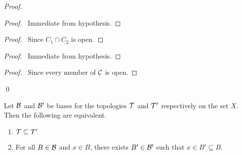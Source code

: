 \begin{proof}
    \pf
    \begin{proof}
        \pf\ Immediate from hypothesis.
    \end{proof}
    \begin{proof}
        \pf\ Since $C_1 \cap C_2$ is open.
    \end{proof}
    \begin{proof}
        \pf\ Immediate from hypothesis.
    \end{proof}
    \begin{proof}
        \pf\ Since every member of $\mathcal{C}$ is open.
    \end{proof}
    \qed
\end{proof}

\begin{lemma}
    Let $\mathcal{B}$ and $\mathcal{B}'$ be bases for the topologies $\mathcal{T}$ and $\mathcal{T}'$ respectively on the set $X$. Then the following are equivalent.
    \begin{enumerate}
        \item $\mathcal{T} \subseteq \mathcal{T}'$
        \item For all $B \in \mathcal{B}$ and $x \in B$, there exists $B' \in \mathcal{B}'$ such that $x \in B' \subseteq B$.
    \end{enumerate}
\end{lemma}


